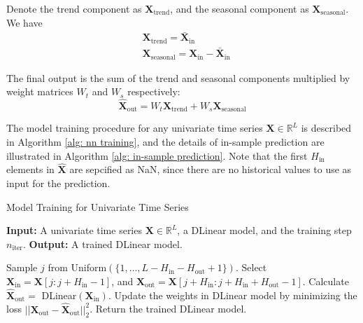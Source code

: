 \documentclass[11pt]{article}
\begin{document}
Denote the trend component as $\bm{X}_{\mathrm{trend}}$, and the seasonal component as $\bm{X}_{\mathrm{seasonal}}$. We have
\begin{align}
	&\bm{X}_{\mathrm{trend}} = \bar{\bm{X}}_{\mathrm{in}}\\
	&\bm{X}_{\mathrm{seasonal}} = \bm{X}_{\mathrm{in}} - \bar{\bm{X}}_{\mathrm{in}}
\end{align}

The final output is the sum of the trend and seasonal components multiplied by weight matrices $W_t$ and $W_s$ respectively:
\begin{equation}
	\hat{\bm{X}}_{\mathrm{out}} = W_t \bm{X}_{\mathrm{trend}} + W_s \bm{X}_{\mathrm{seasonal}}
\end{equation}



The model training procedure for any univariate time series $\bm{X} \in \mathbb{R}^L$ is described in Algorithm \ref{alg: nn training}, and the details of in-sample prediction are illustrated in Algorithm \ref{alg: in-sample prediction}. Note that the first $H_{\mathrm{in}}$ elements in $\hat{\bm{X}}$ are sepcified as NaN, since there are no historical values to use as input for the prediction.
 

\begin{algorithm}
\caption{Model Training for Univariate Time Series}\label{alg: nn training}
\begin{algorithmic}[1] %
\State \textbf{Input:} A univariate time series $\bm{X} \in \mathbb{R}^L$, a DLinear model, and the training step $n_{\mathrm{iter}}$.
\State \textbf{Output:} A trained DLinear model.

    \State Sample $j$ from Uniform$(\{1, \ldots, L-H_{\mathrm{in}}-H_{\mathrm{out}}+1\})$.
    \State Select $\bm{X}_{\mathrm{in}} = \bm{X}[j:j+H_{\mathrm{in}}-1]$, and $\bm{X}_{\mathrm{out}} = \bm{X}[j+H_{\mathrm{in}}:j+H_{\mathrm{in}}+H_{\mathrm{out}}-1]$.
    \State Calculate $\hat{\bm{X}}_{\mathrm{out}} =$ DLinear$(\bm{X}_{\mathrm{in}})$.
    \State Update the weights in DLinear model by minimizing the loss $||\bm{X}_{\mathrm{out}} - \hat{\bm{X}}_{\mathrm{out}}||^2_2$.
\EndFor
\State Return the trained DLinear model.
\end{algorithmic}
\end{algorithm}
\end{document}
